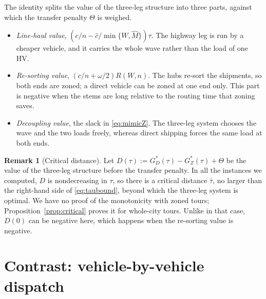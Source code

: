 \documentclass[10pt, reqno]{amsart}
\theoremstyle{definition}
\newtheorem{remark}{Remark}
\begin{document}
The identity splits the value of the three-leg structure into three parts, against which the transfer penalty $\Theta$ is weighed.
\begin{itemize}
\item \emph{Line-haul value}, $(c/n-\hat c/\min\{W,\hat M\})\tau$. The highway leg is run by a cheaper vehicle, and it carries the whole wave rather than the load of one HV.
\item \emph{Re-sorting value}, $(c/n+\omega/2)R(W,n)$. The hubs re-sort the shipments, so both ends are zoned; a direct vehicle can be zoned at one end only. This part is negative when the stems are long relative to the routing time that zoning saves.
\item \emph{Decoupling value}, the slack in \eqref{eq:mimicZ}. The three-leg system chooses the wave and the two loads freely, whereas direct shipping forces the same load at both ends.
\end{itemize}

\begin{remark}[Critical distance]\label{rem:critZ}
Let $D(\tau):=G_D^*(\tau)-G_Z^*(\tau)+\Theta$ be the value of the three-leg structure before the transfer penalty. In all the instances we computed, $D$ is nondecreasing in $\tau$, so there is a critical distance $\bar\tau$, no larger than the right-hand side of \eqref{eq:taubound}, beyond which the three-leg system is optimal. We have no proof of the monotonicity with zoned tours; Proposition~\ref{prop:critical} proves it for whole-city tours. Unlike in that case, $D(0)$ can be negative here, which happens when the re-sorting value is negative.
\end{remark}

\section{Contrast: vehicle-by-vehicle dispatch}\label{sec:wholecity}
\end{document}
